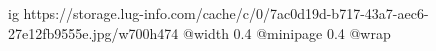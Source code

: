  
 
 
 
 

\ifcmt
  ig https://storage.lug-info.com/cache/c/0/7ac0d19d-b717-43a7-aec6-27e12fb9555e.jpg/w700h474
  @width 0.4
  @minipage 0.4
  @wrap \parpic[r]
\fi
